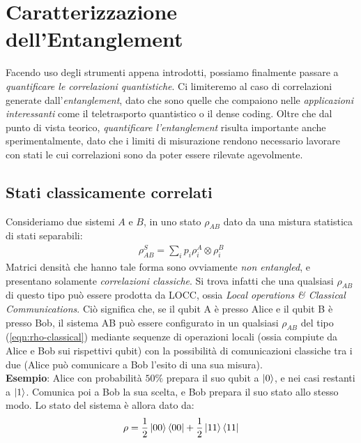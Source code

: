 \documentclass[../../InformazioneQuantistica.tex]{subfiles}
\begin{document}
\section{Caratterizzazione dell'Entanglement}
Facendo uso degli strumenti appena introdotti, possiamo finalmente passare a \textit{quantificare le correlazioni quantistiche}. Ci limiteremo al caso di correlazioni generate dall'\textit{entanglement}, dato che sono quelle che compaiono nelle \textit{applicazioni interessanti} come il teletrasporto quantistico o il dense coding. Oltre che dal punto di vista teorico, \textit{quantificare l'entanglement} risulta importante anche sperimentalmente, dato che i limiti di misurazione rendono necessario lavorare con stati le cui correlazioni sono  da poter essere rilevate agevolmente.

\subsection{Stati classicamente correlati}
Consideriamo due sistemi $A$ e $B$, in uno stato $\rho_{AB}$ dato da una mistura statistica di stati separabili:
\begin{align}
\rho_{AB}^S = \sum_i p_i \rho_i^A \otimes \rho_i^B
\label{eqn:rho-classical}
\end{align}
Matrici densità che hanno tale forma sono ovviamente \textit{non entangled}, e presentano solamente \textit{correlazioni classiche}. Si trova\cite{quantum-classical} infatti che una qualsiasi $\rho_{AB}$ di questo tipo può essere prodotta da LOCC, ossia \textit{Local operations \& Classical Communications}. Ciò significa che, se il qubit A è presso Alice e il qubit B è presso Bob, il sistema AB può essere configurato in un qualsiasi $\rho_{AB}$ del tipo (\ref{eqn:rho-classical}) mediante sequenze di operazioni locali (ossia compiute da Alice e Bob sui rispettivi qubit) con la possibilità di comunicazioni classiche tra i due (Alice può comunicare a Bob l'esito di una sua misura).\\

\textbf{Esempio}: Alice con probabilità $50\%$ prepara il suo qubit a $\Ket{0}$, e nei casi restanti a $\Ket{1}$. Comunica poi a Bob la sua scelta, e Bob prepara il suo stato allo stesso modo. Lo stato del sistema è allora dato da:
\begin{align*}
\rho = \frac{1}{2}\Ket{00}\Bra{00} + \frac{1}{2}\Ket{11}\Bra{11}
\end{align*}
\end{document}
